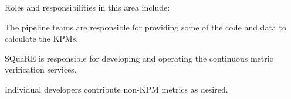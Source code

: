 Roles and responsibilities in this area include:

\begin{itemize_single}

\item The pipeline teams  are responsible for providing some of the code and data to calculate the KPMs.

\item SQuaRE is responsible for developing and operating the continuous metric verification services.

\item Individual developers contribute non-KPM metrics as desired.

\end{itemize_single}
